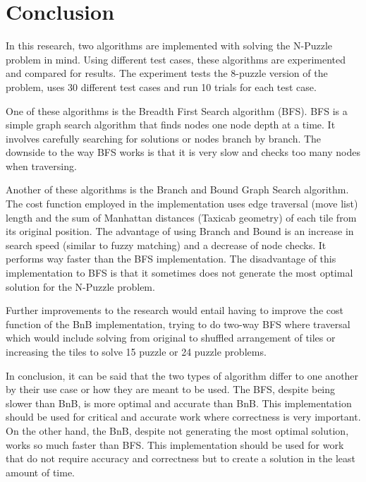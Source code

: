 \section{Conclusion}

\par In this research, two algorithms are implemented with solving the N-Puzzle problem in mind. Using different test cases, these algorithms are experimented and compared for results. The experiment tests the 8-puzzle version of the problem, uses 30 different test cases and run 10 trials for each test case.

\par One of these algorithms is the Breadth First Search algorithm (BFS). BFS is a simple graph search algorithm that finds nodes one node depth at a time. It involves carefully searching for solutions or nodes branch by branch. The downside to the way BFS works is that it is very slow and checks too many nodes when traversing.

\par Another of these algorithms is the Branch and Bound Graph Search algorithm. The cost function employed in the implementation uses edge traversal (move list) length and the sum of Manhattan distances (Taxicab geometry) of each tile from its original position. The advantage of using Branch and Bound is an increase in search speed (similar to fuzzy matching) and a decrease of node checks. It performs way faster than the BFS implementation. The disadvantage of this implementation to BFS is that it sometimes does not generate the most optimal solution for the N-Puzzle problem.

\par Further improvements to the research would entail having to improve the cost function of the BnB implementation, trying to do two-way BFS where traversal which would include solving from original to shuffled arrangement of tiles or increasing the tiles to solve 15 puzzle or 24 puzzle problems.

\par In conclusion, it can be said that the two types of algorithm differ to one another by their use case or how they are meant to be used. The BFS, despite being slower than BnB, is more optimal and accurate than BnB. This implementation should be used for critical and accurate work where correctness is very important. On the other hand, the BnB, despite not generating the most optimal solution, works so much faster than BFS. This implementation should be used for work that do not require accuracy and correctness but to create a solution in the least amount of time.
